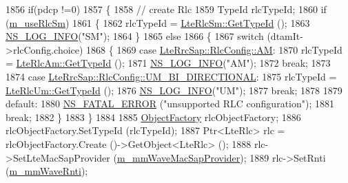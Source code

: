 \begin{DoxyCode}
1856         \textcolor{keywordflow}{if}(pdcp !=0)
1857         \{
1858           \textcolor{comment}{// create Rlc}
1859           TypeId rlcTypeId;
1860           \textcolor{keywordflow}{if} (\hyperlink{classns3_1_1LteUeRrc_a724b0f4009ef95b569c52afb344fd5ae}{m\_useRlcSm})
1861             \{
1862               rlcTypeId = \hyperlink{classns3_1_1LteRlcSm_a160bd39ce4e0d113dd5d93cc3a258045}{LteRlcSm::GetTypeId} ();
1863               \hyperlink{group__logging_gafbd73ee2cf9f26b319f49086d8e860fb}{NS\_LOG\_INFO}(\textcolor{stringliteral}{"SM"});
1864             \}
1865           \textcolor{keywordflow}{else}
1866             \{
1867               \textcolor{keywordflow}{switch} (dtamIt->rlcConfig.choice)
1868                 \{
1869                 \textcolor{keywordflow}{case} \hyperlink{structns3_1_1LteRrcSap_1_1RlcConfig_ab6ab94ca4abaf717926f31db4dddc61baac722b7609a143367fc24a94f8e4f6c7}{LteRrcSap::RlcConfig::AM}: 
1870                   rlcTypeId = \hyperlink{classns3_1_1LteRlcAm_a28143176a465769583d9db0b4b36b91b}{LteRlcAm::GetTypeId} ();
1871                   \hyperlink{group__logging_gafbd73ee2cf9f26b319f49086d8e860fb}{NS\_LOG\_INFO}(\textcolor{stringliteral}{"AM"});
1872                   \textcolor{keywordflow}{break};
1873           
1874                 \textcolor{keywordflow}{case} \hyperlink{structns3_1_1LteRrcSap_1_1RlcConfig_ab6ab94ca4abaf717926f31db4dddc61ba55368feac1627138969235809e6eedc5}{LteRrcSap::RlcConfig::UM\_BI\_DIRECTIONAL}: 
1875                   rlcTypeId = \hyperlink{classns3_1_1LteRlcUm_a119b2b1273c42483a050896d5232829d}{LteRlcUm::GetTypeId} ();
1876                   \hyperlink{group__logging_gafbd73ee2cf9f26b319f49086d8e860fb}{NS\_LOG\_INFO}(\textcolor{stringliteral}{"UM"});
1877                   \textcolor{keywordflow}{break};
1878           
1879                 \textcolor{keywordflow}{default}:
1880                   \hyperlink{group__fatal_ga5131d5e3f75d7d4cbfd706ac456fdc85}{NS\_FATAL\_ERROR} (\textcolor{stringliteral}{"unsupported RLC configuration"});
1881                   \textcolor{keywordflow}{break};                
1882                 \}
1883             \}
1884   
1885           \hyperlink{classns3_1_1Object_a2810e70b8c8377aa8617138fc0f65e92}{ObjectFactory} rlcObjectFactory;
1886           rlcObjectFactory.SetTypeId (rlcTypeId);
1887           Ptr<LteRlc> rlc = rlcObjectFactory.Create ()->GetObject<LteRlc> ();
1888           rlc->SetLteMacSapProvider (\hyperlink{classns3_1_1LteUeRrc_ace6035d94d2a6fb838f107450d49b373}{m\_mmWaveMacSapProvider}); 
1889           rlc->SetRnti (\hyperlink{classns3_1_1LteUeRrc_a0bd0d5c3b49624be1fd217f96910f56a}{m\_mmWaveRnti});

\end{DoxyCode}
